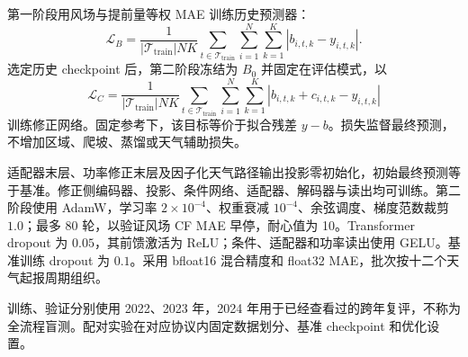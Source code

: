 第一阶段用风场与提前量等权 MAE 训练历史预测器：
\begin{equation}
 \mathcal L_B=\frac{1}{|\mathcal T_{\mathrm{train}}|NK}
 \sum_{t\in\mathcal T_{\mathrm{train}}}\sum_{i=1}^{N}\sum_{k=1}^{K}|b_{i,t,k}-y_{i,t,k}|.
\end{equation}
选定历史 checkpoint 后，第二阶段冻结为 $B_0$ 并固定在评估模式，以
\begin{equation}
 \mathcal L_C=\frac{1}{|\mathcal T_{\mathrm{train}}|NK}
 \sum_{t\in\mathcal T_{\mathrm{train}}}\sum_{i=1}^{N}\sum_{k=1}^{K}
 |b_{i,t,k}+c_{i,t,k}-y_{i,t,k}|
\end{equation}
训练修正网络。固定参考下，该目标等价于拟合残差 $y-b$。损失监督最终预测，不增加区域、爬坡、蒸馏或天气辅助损失。

适配器末层、功率修正末层及因子化天气路径输出投影零初始化，初始最终预测等于基准。修正侧编码器、投影、条件网络、适配器、解码器与读出均可训练。第二阶段使用 AdamW，学习率 $2\times10^{-4}$、权重衰减 $10^{-4}$、余弦调度、梯度范数裁剪 $1.0$；最多 80 轮，以验证风场 CF MAE 早停，耐心值为 10。Transformer dropout 为 $0.05$，其前馈激活为 ReLU；条件、适配器和功率读出使用 GELU。基准训练 dropout 为 $0.1$。采用 bfloat16 混合精度和 float32 MAE，批次按十二个天气起报周期组织。

训练、验证分别使用 2022、2023 年，2024 年用于已经查看过的跨年复评，不称为全流程盲测。配对实验在对应协议内固定数据划分、基准 checkpoint 和优化设置。
